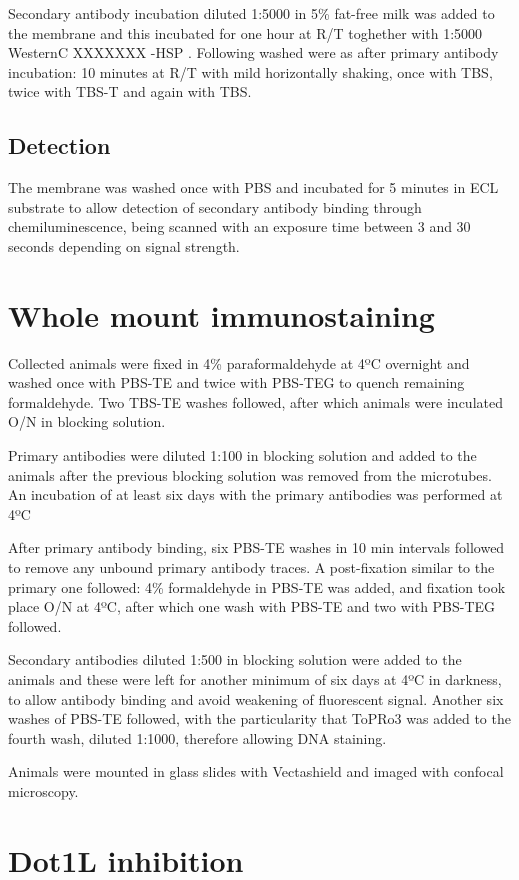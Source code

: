 \documentclass[11pt,twoside,a4paper]{report}
\begin{document}
			Secondary antibody incubation diluted 1:5000 in 5\% fat-free milk was added to the membrane and this incubated for one hour at R/T toghether with 1:5000 WesternC XXXXXXX -HSP . Following washed were as after primary antibody incubation: 10 minutes at R/T with mild horizontally shaking, once with TBS, twice with TBS-T and again with TBS.
			\subsection{Detection}
			The membrane was washed once with PBS and incubated for 5 minutes in ECL substrate to allow detection of secondary antibody binding through chemiluminescence, being scanned with an exposure time between 3 and 30 seconds depending on signal strength.
		
	\section{Whole mount immunostaining}
		Collected animals were fixed in 4\% paraformaldehyde at 4ºC overnight and washed once with PBS-TE and twice with PBS-TEG to quench remaining formaldehyde. Two TBS-TE washes followed, after which animals were inculated O/N in blocking solution.
		
		Primary antibodies were diluted 1:100 in blocking solution and added to the animals after the previous blocking solution was removed from the microtubes. An incubation of at least six days with the primary antibodies was performed at 4ºC
		
		After primary antibody binding, six PBS-TE washes in 10 min intervals followed to remove any unbound primary antibody traces. A post-fixation similar to the primary one followed: 4\% formaldehyde in PBS-TE was added, and fixation took place O/N at 4ºC, after which one wash with PBS-TE and two with PBS-TEG followed. 
		
		Secondary antibodies diluted 1:500 in blocking solution were added to the animals  and these were left for another minimum of six days at 4ºC in darkness, to allow antibody binding and avoid weakening of fluorescent signal. Another six washes of PBS-TE followed, with the particularity that ToPRo3 was added to the fourth wash, diluted 1:1000, therefore allowing DNA staining.
		
		Animals were mounted in glass slides with Vectashield and imaged with confocal microscopy.
	
	\section{Dot1L inhibition}
\end{document}
